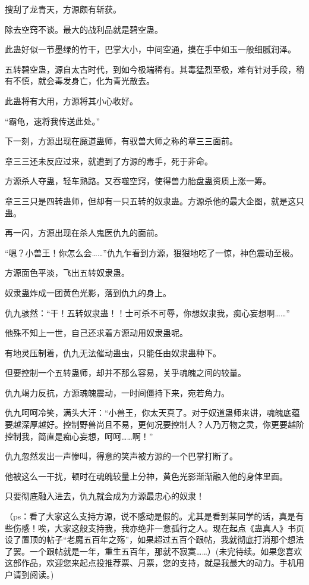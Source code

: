 \begin{this_body}
搜刮了龙青天，方源颇有斩获。

除去空窍不谈。最大的战利品就是碧空蛊。

此蛊好似一节墨绿的竹干，巴掌大小，中间空通，摸在手中如玉一般细腻润泽。

五转碧空蛊，源自太古时代，到如今极端稀有。其毒猛烈至极，难有针对手段，稍有不慎，就会毒发身亡，化为青光散去。

此蛊将有大用，方源将其小心收好。

“霸龟，速将我传送此处。”

下一刻，方源出现在魔道蛊师，有驭兽大师之称的章三三面前。

章三三还未反应过来，就遭到了方源的毒手，死于非命。

方源杀人夺蛊，轻车熟路。又吞噬空窍，使得兽力胎盘蛊资质上涨一筹。

章三三只是四转蛊师，但却有一只五转的奴隶蛊。方源杀他的最大企图，就是这只蛊。

再一闪，方源出现在杀人鬼医仇九的面前。

“嗯？小兽王！你怎么会……”仇九乍看到方源，狠狠地吃了一惊，神色震动至极。

方源面色平淡，飞出五转奴隶蛊。

奴隶蛊炸成一团黄色光影，落到仇九的身上。

仇九骇然：“干！五转奴隶蛊！！士可杀不可辱，你想奴隶我，痴心妄想啊……”

他殊不知上一世，自己还求着方源动用奴隶蛊呢。

有地灵压制着，仇九无法催动蛊虫，只能任由奴隶蛊种下。

但要控制一个五转蛊师，却并不那么容易，关乎魂魄之间的较量。

仇九竭力反抗，方源魂魄震动，一时间僵持下来，宛若角力。

仇九呵呵冷笑，满头大汗：“小兽王，你太天真了。对于奴道蛊师来讲，魂魄底蕴要越深厚越好。控制野兽尚且不易，更何况要控制人？人乃万物之灵，你更要越阶控制我，简直是痴心妄想，呵呵……啊！”

仇九忽然发出一声惨叫，得意的笑声被方源的一个巴掌打断了。

他被这么一干扰，顿时在魂魄较量上分神，黄色光影渐渐融入他的身体里面。

只要彻底融入进去，仇九就会成为方源最忠心的奴隶！

（ps：看了大家这么支持方源，说不感动是假的。尤其是看到某同学的话，真是有些伤感！唉，大家这般支持我，我亦绝非一意孤行之人。现在起点《蛊真人》书页设了置顶的帖子“老魔五百年之殇”，如果超过五百个跟帖，我就彻底打消那个想法了罢。一个跟帖就是一年，重生五百年，那就不寂寞……）(未完待续。如果您喜欢这部作品，欢迎您来起点投推荐票、月票，您的支持，就是我最大的动力。手机用户请到阅读。)

\end{this_body}


